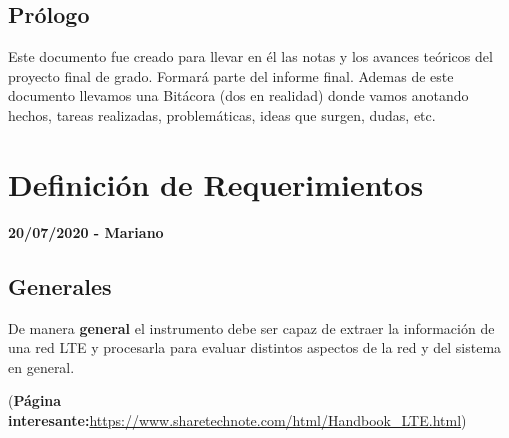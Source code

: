 \documentclass[a4paper,12pt]{report} %
\begin{document}
	
\section*{Prólogo}
Este documento fue creado para llevar en él las notas y los avances teóricos del proyecto final de grado. Formará parte del informe final.
Ademas de este documento llevamos una Bitácora (dos en realidad) donde vamos anotando hechos, tareas realizadas, problemáticas, ideas que surgen, dudas, etc. 
\thispagestyle{empty}

 \chapter{Definición de Requerimientos}

\textbf{20/07/2020 - Mariano}

\section{Generales \cite{gutierrez2020measurement}}

De manera \textbf{general} el instrumento debe ser capaz de extraer la información de una red LTE y procesarla para evaluar distintos aspectos de la red y del sistema en general.

(\textbf{Página interesante:}\url{https://www.sharetechnote.com/html/Handbook_LTE.html})
\end{document}
